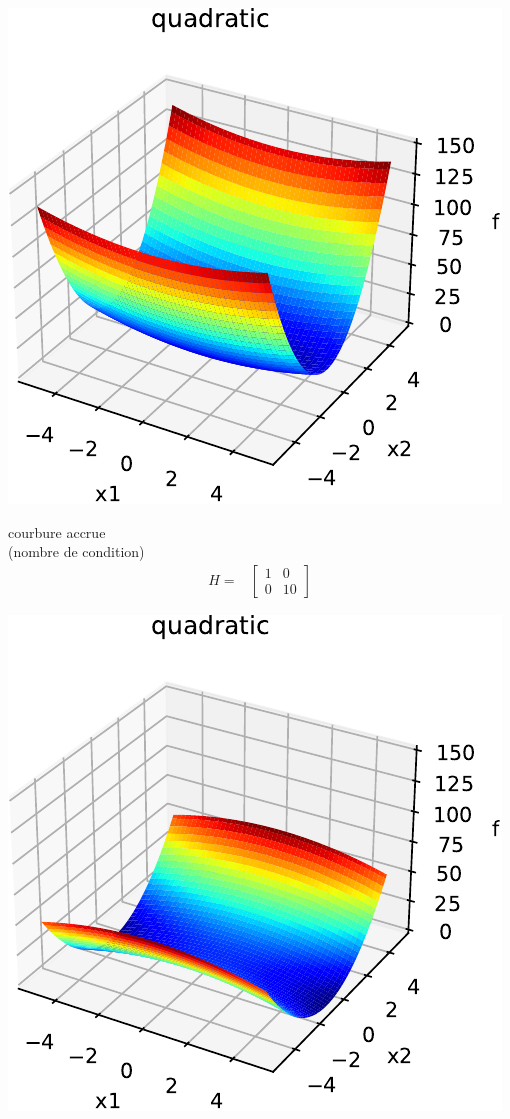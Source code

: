 \documentclass[12pt]{beamer}
\begin{document}
\begin{frame}[allowframebreaks]
\begin{minipage}{0.5\textwidth}
\includegraphics[width=\textwidth]{quad_rot0_cond10_H_1_0_0_10-crop.pdf}
\end{minipage}
\begin{minipage}{0.4\textwidth}
courbure accrue \\ 
(nombre de condition)
\begin{align*}
H =& \begin{bmatrix} 1 & 0 \\ 0 & 10\end{bmatrix}  
\end{align*}
\end{minipage}
\newpage
\begin{minipage}{0.5\textwidth}
\includegraphics[width=\textwidth]{quad_rot0_condm5_H_m1_0_0_5-crop.pdf}

\end{minipage}
\end{frame}
\end{document}
